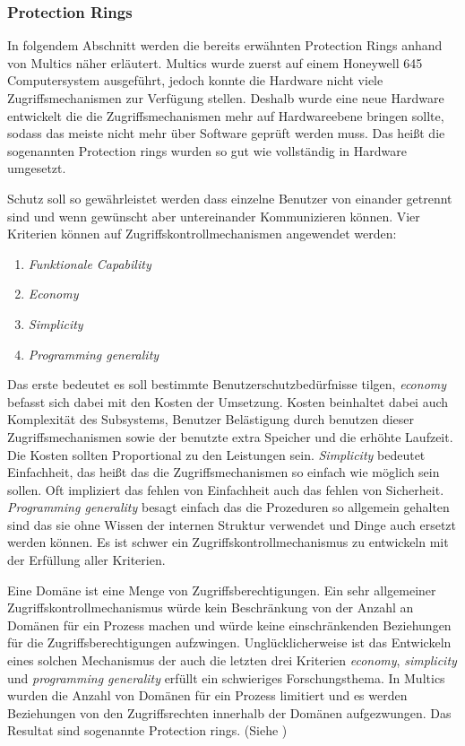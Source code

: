 \documentclass[11pt,technote]{IEEEtran}
\begin{document}
      \subsubsection{Protection Rings} \label{subsubsec:protectrings}
        In folgendem Abschnitt werden die bereits erw\"ahnten Protection Rings anhand von Multics n\"aher erl\"autert.
        Multics wurde zuerst auf einem Honeywell 645 Computersystem ausgef\"uhrt, jedoch konnte die Hardware nicht viele Zugriffsmechanismen zur Verf\"ugung stellen.
        Deshalb wurde eine neue Hardware entwickelt die die Zugriffsmechanismen mehr auf Hardwareebene bringen sollte, sodass das meiste nicht mehr \"uber Software
        gepr\"uft werden muss. Das hei\ss t die sogenannten Protection rings wurden so gut wie vollst\"andig in Hardware umgesetzt. \cite{inproc:protec-rings}
    
        Schutz soll so gew\"ahrleistet werden dass einzelne Benutzer von einander getrennt sind und wenn gew\"unscht aber untereinander Kommunizieren k\"onnen.
        Vier Kriterien k\"onnen auf Zugriffskontrollmechanismen angewendet werden: 
        \begin{enumerate}
          \item \textit{Funktionale Capability}
          \item \textit{Economy}
          \item \textit{Simplicity}
          \item \textit{Programming generality}
        \end{enumerate}
        Das erste bedeutet es soll bestimmte Benutzerschutzbed\"urfnisse tilgen, \textit{economy} befasst sich dabei mit den Kosten der Umsetzung.
        Kosten beinhaltet dabei auch Komplexit\"at des Subsystems, Benutzer Bel\"astigung durch benutzen dieser Zugriffsmechanismen sowie der benutzte
        extra Speicher und die erh\"ohte Laufzeit. Die Kosten sollten Proportional zu den Leistungen sein.
        \textit{Simplicity} bedeutet Einfachheit, das hei\ss t das die Zugriffsmechanismen so einfach wie m\"oglich sein sollen. Oft
        impliziert das fehlen von Einfachheit auch das fehlen von Sicherheit. \textit{Programming generality} besagt einfach das die Prozeduren so allgemein gehalten sind
        das sie ohne Wissen der internen Struktur verwendet und Dinge auch ersetzt werden k\"onnen.
        Es ist schwer ein Zugriffskontrollmechanismus zu entwickeln mit der Erf\"ullung aller Kriterien.
     
        Eine Dom\"ane ist eine Menge von Zugriffsberechtigungen. Ein sehr allgemeiner Zugriffskontrollmechanismus w\"urde kein Beschr\"ankung von der Anzahl an
        Dom\"anen f\"ur ein Prozess machen und w\"urde keine einschr\"ankenden Beziehungen f\"ur die Zugriffsberechtigungen aufzwingen.
        Ungl\"ucklicherweise ist das Entwickeln eines solchen Mechanismus der auch die letzten drei Kriterien \textit{economy}, \textit{simplicity} und \textit{programming generality}
        erf\"ullt ein schwieriges Forschungsthema.  In Multics wurden die Anzahl von Dom\"anen f\"ur ein Prozess limitiert und es werden Beziehungen von den Zugriffsrechten innerhalb
        der Dom\"anen aufgezwungen. Das Resultat sind sogenannte Protection rings. (Siehe \cite[S. 160]{inproc:protec-rings}) 
        
\end{document}
